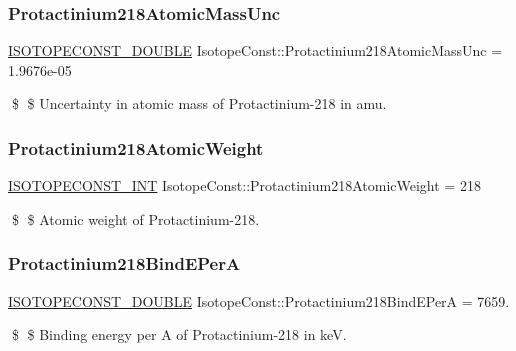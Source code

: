 \subsubsection{\texorpdfstring{Protactinium218\+Atomic\+Mass\+Unc}{Protactinium218AtomicMassUnc}}
{\footnotesize\ttfamily \mbox{\hyperlink{group___isotope_const-_macros_ga8f45a7272ce02c0b4c65c44636ed719a}{I\+S\+O\+T\+O\+P\+E\+C\+O\+N\+S\+T\+\_\+\+D\+O\+U\+B\+LE}} Isotope\+Const\+::\+Protactinium218\+Atomic\+Mass\+Unc = 1.\+9676e-\/05}

\$ \$ Uncertainty in atomic mass of Protactinium-\/218 in amu. \mbox{\label{group___isotope_const-_protactinium-_pa218_gad0d85e6f25eef38bf7507c10c9cc79ed}} 
\subsubsection{\texorpdfstring{Protactinium218\+Atomic\+Weight}{Protactinium218AtomicWeight}}
{\footnotesize\ttfamily \mbox{\hyperlink{group___isotope_const-_macros_ga5f18360b3e99483a35c32d789e62621c}{I\+S\+O\+T\+O\+P\+E\+C\+O\+N\+S\+T\+\_\+\+I\+NT}} Isotope\+Const\+::\+Protactinium218\+Atomic\+Weight = 218}

\$ \$ Atomic weight of Protactinium-\/218. \mbox{\label{group___isotope_const-_protactinium-_pa218_ga482329c4294bfbdc3a2fc8790aa3e13f}} 
\subsubsection{\texorpdfstring{Protactinium218\+Bind\+E\+PerA}{Protactinium218BindEPerA}}
{\footnotesize\ttfamily \mbox{\hyperlink{group___isotope_const-_macros_ga8f45a7272ce02c0b4c65c44636ed719a}{I\+S\+O\+T\+O\+P\+E\+C\+O\+N\+S\+T\+\_\+\+D\+O\+U\+B\+LE}} Isotope\+Const\+::\+Protactinium218\+Bind\+E\+PerA = 7659.}

\$ \$ Binding energy per A of Protactinium-\/218 in keV. \mbox{\label{group___isotope_const-_protactinium-_pa218_ga0d22e87a599001a26e43befe1aad0556}} 
